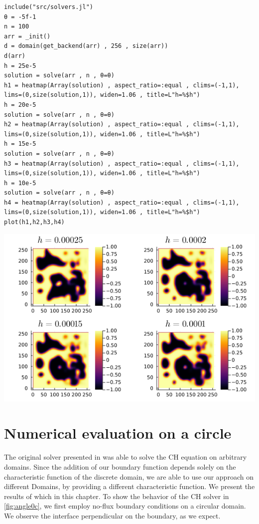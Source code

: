 \documentclass{mimosis}
\begin{document}
\begin{verbatim}
include("src/solvers.jl")
θ = -5f-1
n = 100
arr = _init()
d = domain(get_backend(arr) , 256 , size(arr))
d(arr)
h = 25e-5
solution = solve(arr , n , θ=θ)
h1 = heatmap(Array(solution) , aspect_ratio=:equal , clims=(-1,1), lims=(0,size(solution,1)), widen=1.06 , title=L"h=%$h")
h = 20e-5
solution = solve(arr , n , θ=θ)
h2 = heatmap(Array(solution) , aspect_ratio=:equal , clims=(-1,1), lims=(0,size(solution,1)), widen=1.06 , title=L"h=%$h")
h = 15e-5
solution = solve(arr , n , θ=θ)
h3 = heatmap(Array(solution) , aspect_ratio=:equal , clims=(-1,1), lims=(0,size(solution,1)), widen=1.06 , title=L"h=%$h")
h = 10e-5
solution = solve(arr , n , θ=θ)
h4 = heatmap(Array(solution) , aspect_ratio=:equal , clims=(-1,1), lims=(0,size(solution,1)), widen=1.06 , title=L"h=%$h")
plot(h1,h2,h3,h4)
\end{verbatim}

\begin{center}
\includegraphics[width=.9\linewidth]{images/random-square.png}
\label{fig:random-square}
\end{center}
\chapter{Numerical evaluation on a circle}
\label{sec:org8f4cb79}
The original solver presented in \autocite{SHIN20117441} was able to solve the CH equation on arbitrary domains. Since the addition of our boundary function depends solely on the characteristic function of the discrete domain, we are able to use our approach on different Domains, by providing a different characteristic function. We present the results of which in this chapter.
To show the behavior of the CH solver in \ref{fig:angle0c}, we first employ no-flux boundary conditions on a circular domain. We observe the interface perpendicular on the boundary, as we expect.
\end{document}
